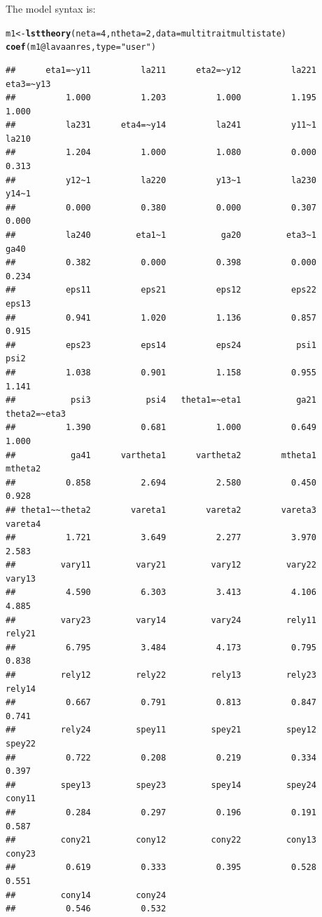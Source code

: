 \documentclass[10pt]{article}\usepackage{graphicx, color}
\makeatletter
\newcommand{\hlfunctioncall}[1]{\textcolor[rgb]{0.501960784313725,0,0.329411764705882}{\textbf{#1}}}%
\newcommand{\hlstring}[1]{\textcolor[rgb]{0.6,0.6,1}{#1}}%
\newenvironment{kframe}{%
 \def\at@end@of@kframe{}%
 \ifinner\ifhmode%
  \def\at@end@of@kframe{\end{minipage}}%
  \begin{minipage}{\columnwidth}%
 \fi\fi%
 \def\FrameCommand##1{\hskip\@totalleftmargin \hskip-\fboxsep
 \colorbox{shadecolor}{##1}\hskip-\fboxsep
     \hskip-\linewidth \hskip-\@totalleftmargin \hskip\columnwidth}%
 \MakeFramed {\advance\hsize-\width
   \@totalleftmargin\z@ \linewidth\hsize
   \@setminipage}}%
 {\par\unskip\endMakeFramed%
 \at@end@of@kframe}
\newenvironment{knitrout}{}{} %
\makeatother
\begin{document}
The model syntax is:

%
\begin{knitrout}
\color{fgcolor}\begin{kframe}
\begin{alltt}
m1 <- \hlfunctioncall{lsttheory}(neta = 4, ntheta = 2, data = multitraitmultistate)
\hlfunctioncall{coef}(m1@lavaanres, type = \hlstring{"user"})
\end{alltt}
\begin{verbatim}
##      eta1=~y11          la211      eta2=~y12          la221      eta3=~y13 
##          1.000          1.203          1.000          1.195          1.000 
##          la231      eta4=~y14          la241          y11~1          la210 
##          1.204          1.000          1.080          0.000          0.313 
##          y12~1          la220          y13~1          la230          y14~1 
##          0.000          0.380          0.000          0.307          0.000 
##          la240         eta1~1           ga20         eta3~1           ga40 
##          0.382          0.000          0.398          0.000          0.234 
##          eps11          eps21          eps12          eps22          eps13 
##          0.941          1.020          1.136          0.857          0.915 
##          eps23          eps14          eps24           psi1           psi2 
##          1.038          0.901          1.158          0.955          1.141 
##           psi3           psi4   theta1=~eta1           ga21   theta2=~eta3 
##          1.390          0.681          1.000          0.649          1.000 
##           ga41      vartheta1      vartheta2        mtheta1        mtheta2 
##          0.858          2.694          2.580          0.450          0.928 
## theta1~~theta2        vareta1        vareta2        vareta3        vareta4 
##          1.721          3.649          2.277          3.970          2.583 
##         vary11         vary21         vary12         vary22         vary13 
##          4.590          6.303          3.413          4.106          4.885 
##         vary23         vary14         vary24         rely11         rely21 
##          6.795          3.484          4.173          0.795          0.838 
##         rely12         rely22         rely13         rely23         rely14 
##          0.667          0.791          0.813          0.847          0.741 
##         rely24         spey11         spey21         spey12         spey22 
##          0.722          0.208          0.219          0.334          0.397 
##         spey13         spey23         spey14         spey24         cony11 
##          0.284          0.297          0.196          0.191          0.587 
##         cony21         cony12         cony22         cony13         cony23 
##          0.619          0.333          0.395          0.528          0.551 
##         cony14         cony24 
##          0.546          0.532
\end{verbatim}
\end{kframe}
\end{knitrout}
\end{document}

